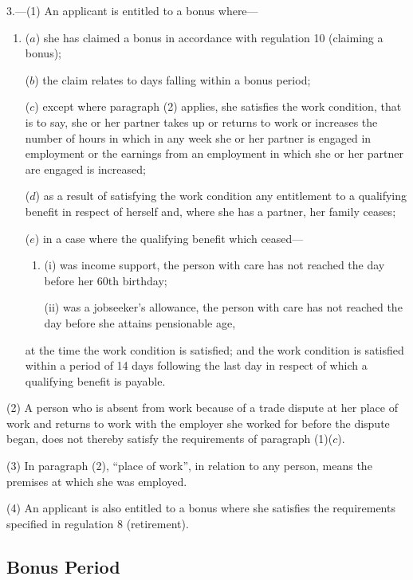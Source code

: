 \documentclass[a4paper]{article}
\begin{document}
3.—(1) An applicant is entitled to a bonus where—
\begin{enumerate}\item[]
($a$) she has claimed a bonus in accordance with regulation 10 (claiming a bonus);

($b$) the claim relates to days falling within a bonus period;

($c$) except where paragraph (2) applies, she satisfies the work condition, that is to say, she or her partner takes up or returns to work or increases the number of hours in which in any week she or her partner is engaged in employment or the earnings from an employment in which she or her partner are engaged is increased;

($d$) as a result of satisfying the work condition any entitlement to a qualifying benefit in respect of herself and, where she has a partner, her family ceases;

($e$) in a case where the qualifying benefit which ceased—
\begin{enumerate}\item[]
(i) was income support, the person with care has not reached the day before her 60th birthday;

(ii) was a jobseeker’s allowance, the person with care has not reached the day before she attains pensionable age,
\end{enumerate}
at the time the work condition is satisfied; and the work condition is satisfied within a period of 14 days following the last day in respect of which a qualifying benefit is payable.
\end{enumerate}

(2) A person who is absent from work because of a trade dispute at her place of work and returns to work with the employer she worked for before the dispute began, does not thereby satisfy the requirements of paragraph (1)($c$).

(3) In paragraph (2), “place of work”, in relation to any person, means the premises at which she was employed.

(4) An applicant is also entitled to a bonus where she satisfies the requirements specified in regulation 8 (retirement).

\subsection[4. Bonus Period]{Bonus Period}
\end{document}
